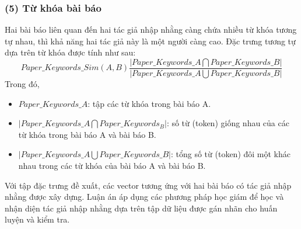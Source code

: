 \subsubsection*{(5) Từ khóa bài báo}
Hai bài báo liên quan đến hai tác giả nhập nhằng càng chứa nhiều từ khóa tương tự nhau, thì khả năng hai tác giả này là một người càng cao. Đặc trưng tương tự dựa trên từ khóa được tính như sau:
\begin{equation}
Paper\_Keywords\_Sim(A,B) \displaystyle\frac{|Paper\_Keywords\_A \bigcap Paper\_Keywords\_B|}{|Paper\_Keywords\_A \bigcup Paper\_Keywords\_B|}
\end{equation}
Trong đó,
\begin{itemize}
\item $Paper\_Keywords\_A$: tập các từ khóa trong bài báo A.
\item $|Paper\_Keywords\_A \bigcap Paper\_Keywords_B|$: số từ (token) giống nhau của các từ khóa trong bài báo A và bài báo B.
\item $|Paper\_Keywords\_A \bigcup Paper\_Keywords\_B|$: tổng số từ (token) đôi một khác nhau trong các từ khóa của bài báo A và bài báo B.
\end{itemize}

Với tập đặc trưng đề xuất, các vector tương ứng với hai bài báo có tác giả nhập nhằng được xây dựng. Luận án áp dụng các phương pháp học giám để học và nhận diện tác giả nhập nhằng dựa trên tập dữ liệu được gán nhãn cho huấn luyện và kiểm tra. 

